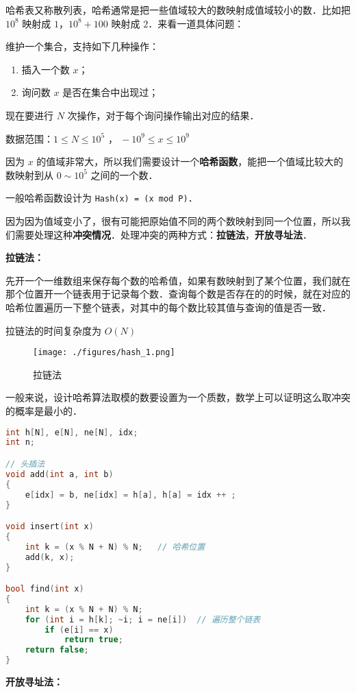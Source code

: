 
哈希表又称散列表，哈希通常是把一些值域较大的数映射成值域较小的数．比如把 $10^8$ 映射成 $1$，$10^8 + 100$ 映射成 $2$．来看一道具体问题：

维护一个集合，支持如下几种操作：

\begin{enumerate}
\item 插入一个数 $x$；

\item 询问数 $x$ 是否在集合中出现过；

\end{enumerate}
现在要进行 $N$ 次操作，对于每个询问操作输出对应的结果．

数据范围：$ 1 \le N \le 10^5$ ，$\ -10^9 \le x \le 10^9$

因为 $x$ 的值域非常大，所以我们需要设计一个\textbf{哈希函数}，能把一个值域比较大的数映射到从 $0 \sim 10^5$ 之间的一个数．

一般哈希函数设计为 \verb|Hash(x) = (x mod P)|．

因为因为值域变小了，很有可能把原始值不同的两个数映射到同一个位置，所以我们需要处理这种\textbf{冲突情况}．处理冲突的两种方式：\textbf{拉链法}，\textbf{开放寻址法}．

\textbf{拉链法：}

先开一个一维数组来保存每个数的哈希值，如果有数映射到了某个位置，我们就在那个位置开一个链表用于记录每个数．查询每个数是否存在的的时候，就在对应的哈希位置遍历一下整个链表，对其中的每个数比较其值与查询的值是否一致．

拉链法的时间复杂度为 $O(N)$
\begin{figure}[ht]
\centering
\texttt{[image: ./figures/hash\_1.png]}
\caption{拉链法} \label{hash_fig1}
\end{figure}

一般来说，设计哈希算法取模的数要设置为一个质数，数学上可以证明这么取冲突的概率是最小的．
\begin{lstlisting}[language=cpp]
int h[N], e[N], ne[N], idx;
int n;

// 头插法
void add(int a, int b)
{
    e[idx] = b, ne[idx] = h[a], h[a] = idx ++ ;
}

void insert(int x)
{
    int k = (x % N + N) % N;   // 哈希位置
    add(k, x);
}

bool find(int x)
{
    int k = (x % N + N) % N;
    for (int i = h[k]; ~i; i = ne[i])  // 遍历整个链表
        if (e[i] == x)
            return true;
    return false;
}
\end{lstlisting}

\textbf{开放寻址法：}

